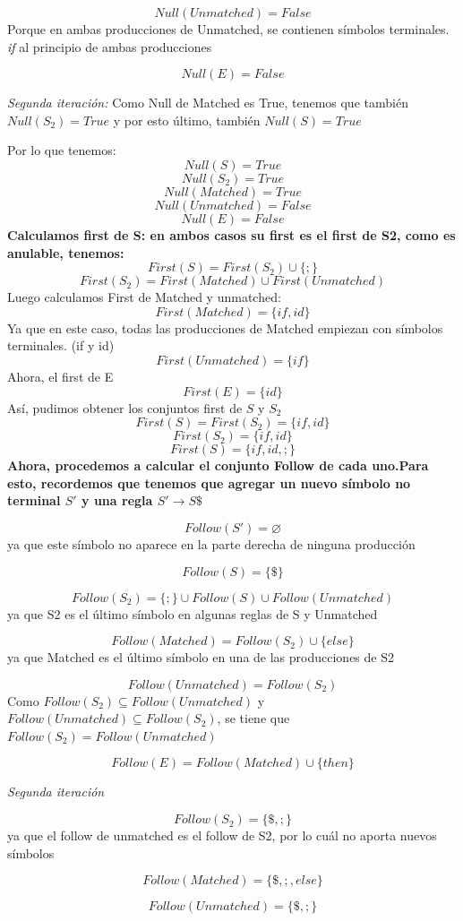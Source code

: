 \documentclass[12pt, letterpaper]{article}
\begin{document}
\begin{enumerate}
\[
Null(Unmatched) = False
\] Porque en ambas producciones de Unmatched, se contienen símbolos terminales. \textit{if} al principio de ambas producciones

\[Null(E) = False\]

\textit{Segunda iteración:}
Como Null de Matched es True, tenemos que también $Null(S_2) = True$ y por esto último, también $Null(S) = True$

Por lo que tenemos:
\[Null(S) = True\]
\[Null(S_2) = True\]
\[Null(Matched) = True\]
\[Null(Unmatched) = False\]
\[Null(E) = False\]
\textbf{Calculamos first de S: en ambos casos su first es el first de S2, como es anulable, tenemos:}
\[
First(S) = First(S_2) \cup \{;\}
\]
\[
First(S_2) = First(Matched) \cup First(Unmatched)
\]
Luego calculamos First de Matched y unmatched:
\[
First(Matched) = \{if, id\}
\]
Ya que en este caso, todas las producciones de Matched empiezan con símbolos terminales. (if y id)
\[
First(Unmatched) = \{if\}
\]
Ahora, el first de E
\[
First(E) = \{id\}
\]
Así, pudimos obtener los conjuntos first de $S$ y $S_2$
\[
First(S) = First(S_2) = \{if, id\}
\]
\[
First(S_2) = \{if, id\}
\]
\[
First(S) = \{if, id, ;\}
\]
\textbf{Ahora, procedemos a calcular el conjunto Follow de cada uno.Para esto, recordemos que tenemos que agregar un nuevo símbolo no terminal $S'$ y una regla $S' \rightarrow S\$$}

\[Follow(S') = \varnothing\] ya que este símbolo no aparece en la parte derecha de ninguna producción

\[Follow(S) = \{\$\}\]

\[Follow(S_2) = \{;\}\cup Follow(S) \cup Follow(Unmatched)\] ya que S2 es el último símbolo en algunas reglas de S y Unmatched

\[Follow(Matched) = Follow(S_2) \cup \{else\}\] ya que Matched es el último símbolo en una de las producciones de S2

\[Follow(Unmatched) = Follow(S_2)\] Como $Follow(S_2) \subseteq Follow(Unmatched)$ y $Follow(Unmatched) \subseteq Follow(S_2)$, se tiene que $Follow(S_2) = Follow(Unmatched)$

\[Follow(E) = Follow(Matched) \cup \{then\}\]

\textit{Segunda iteración}

\[Follow(S_2) = \{\$, ;\}\] ya que el follow de unmatched es el follow de S2, por lo cuál no aporta nuevos símbolos

\[Follow(Matched) = \{\$, ;, else\}\]

\[Follow(Unmatched) = \{\$, ;\}\]


\end{enumerate}
\end{document}
